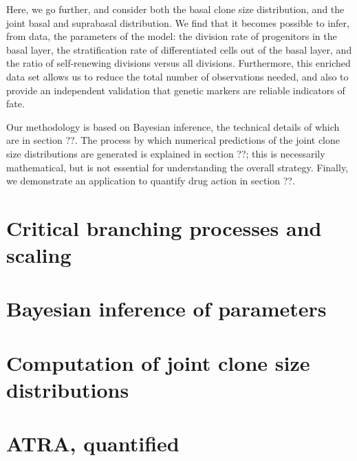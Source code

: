 \documentclass[10pt,UKenglish]{article}
\begin{document}
Here, we go further, and consider both the basal clone size distribution, and
the joint basal and suprabasal distribution. We find that it becomes possible to
infer, from data, the parameters of the model: the division rate of progenitors
in the basal layer, the stratification rate of differentiated cells out of the
basal layer, and the ratio of self-renewing divisions versus all divisions.
Furthermore, this enriched data set allows us to reduce the total number of
observations needed, and also to provide an independent validation that genetic
markers are reliable indicators of fate. 

Our methodology is based on Bayesian inference, the technical details of which
are in section ??. The process by which numerical predictions of the joint clone
size distributions are generated is explained in section ??; this is necessarily
mathematical, but is not essential for understanding the overall strategy.
Finally, we demonstrate an application to quantify drug action in section ??.

\section{Critical branching processes and scaling}

\section{Bayesian inference of parameters}

\section{Computation of joint clone size distributions}

\section{ATRA, quantified}
\end{document}
